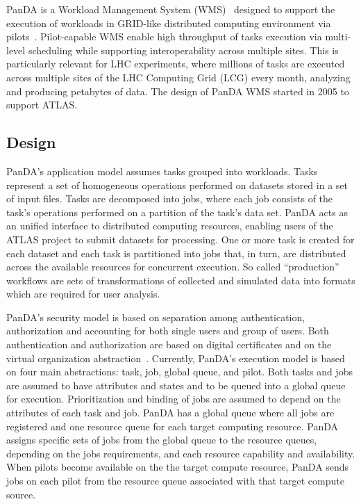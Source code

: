 PanDA is a Workload Management System (WMS)~\cite{marco2009glite} designed to
support the execution of workloads in GRID-like distributed computing
environment  via pilots~\cite{turilli2017comprehensive}.  Pilot-capable WMS
enable high throughput of tasks execution via multi-level scheduling while
supporting interoperability across multiple sites. This is particularly
relevant for LHC experiments, where millions of tasks are executed across
multiple sites of the LHC Computing Grid (LCG) every month, analyzing and
producing petabytes of data. The design of PanDA WMS started in 2005 to
support ATLAS.

\subsection{Design}
\label{subsec:design}

PanDA's application model assumes tasks grouped into workloads. Tasks
represent a set of homogeneous operations performed on datasets stored in a
set of input files. Tasks are decomposed into jobs, where each job consists
of the task's operations performed on a partition of the task's data set.
PanDA acts as an unified interface to distributed computing resources,
enabling users of the ATLAS project to submit datasets for processing. One or
more task is created for each dataset and each task is partitioned into jobs
that, in turn, are distributed across the available resources for concurrent
execution. So called ``production'' workflows are sets of transformations of
collected and simulated data into formats which are required for user
analysis.

PanDA's security model is based on separation among authentication,
authorization and accounting for both single users and group of users. Both
authentication and authorization are based on digital certificates and on the
virtual organization abstraction~\cite{foster2001anatomy}. Currently, PanDA's
execution model is based on four main abstractions: task, job, global queue,
and pilot. Both tasks and jobs are assumed to have attributes and states and
to be queued into a global queue for execution. Prioritization and binding of
jobs are assumed to depend on the attributes of each task and  job. PanDA has
a global queue where all jobs are registered and one resource queue for each
target  computing resource. PanDA assigns specific sets of jobs from the
global queue to the resource queues, depending on the jobs requirements, and
each resource capability and availability. When pilots become available on
the the target compute resource, PanDA  sends jobs on each pilot from the
resource  queue associated with that target compute source.

